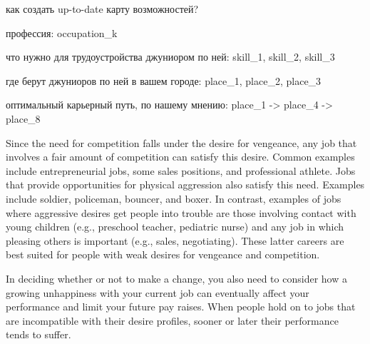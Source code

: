 \documentclass[11pt]{article}
\theoremstyle{remark}
\theoremstyle{definition}
\begin{document}


как создать up-to-date карту возможностей?



профессия: occupation_k

что нужно для трудоустройства джуниором по ней: skill_1, skill_2, skill_3

где берут джуниоров по ней в вашем городе: place_1, place_2, place_3

оптимальный карьерный путь, по нашему мнению: place_1 -> place_4 -> place_8













Since the need for competition falls under the desire for vengeance, any job that involves a fair amount of competition can satisfy this desire. Common examples include entrepreneurial jobs, some sales positions, and professional athlete. Jobs that provide opportunities for physical aggression also satisfy this need. Examples include soldier, policeman, bouncer, and boxer. In contrast, examples of jobs where aggressive desires get people into trouble are those involving contact with young children (e.g., preschool teacher, pediatric nurse) and any job in which pleasing others is important (e.g., sales, negotiating). These latter careers are best suited for people with weak desires for vengeance and competition.

In deciding whether or not to make a change, you also need to consider how a growing unhappiness with your current job can eventually affect your performance and limit your future pay raises. When people hold on to jobs that are incompatible with their desire profiles, sooner or later their performance tends to suffer.
\end{document}
